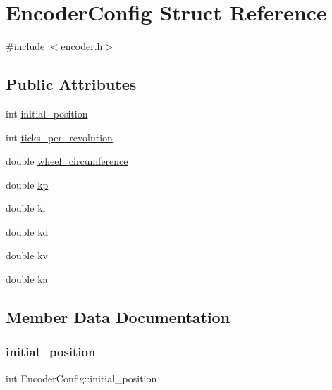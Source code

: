 \hypertarget{structEncoderConfig}{}\section{Encoder\+Config Struct Reference}
\label{structEncoderConfig}


{\ttfamily \#include $<$encoder.\+h$>$}

\subsection*{Public Attributes}
\begin{DoxyCompactItemize}
\item 
int \mbox{\hyperlink{structEncoderConfig_a14a62992c5c58d35c268189025083b16}{initial\+\_\+position}}
\item 
int \mbox{\hyperlink{structEncoderConfig_a2e0c8cadba598923ab9862073ad7be81}{ticks\+\_\+per\+\_\+revolution}}
\item 
double \mbox{\hyperlink{structEncoderConfig_af31ada23da9d2b7d4bb7fdaf6877bc00}{wheel\+\_\+circumference}}
\item 
double \mbox{\hyperlink{structEncoderConfig_a3b46cafc3487e36bcbc7a989f6ce9d7e}{kp}}
\item 
double \mbox{\hyperlink{structEncoderConfig_aa076546a13f85275b48de9348e1798ef}{ki}}
\item 
double \mbox{\hyperlink{structEncoderConfig_ab7fae8f690d761d79f3a9d6295fa7c22}{kd}}
\item 
double \mbox{\hyperlink{structEncoderConfig_a6128ef443ff9c7ea3de1ace0e43b86cb}{kv}}
\item 
double \mbox{\hyperlink{structEncoderConfig_a327c5606e1a7487c072bda6860ad9104}{ka}}
\end{DoxyCompactItemize}


\subsection{Member Data Documentation}
\mbox{\label{structEncoderConfig_a14a62992c5c58d35c268189025083b16}} 
\subsubsection{\texorpdfstring{initial\_position}{initial\_position}}
{\footnotesize\ttfamily int Encoder\+Config\+::initial\+\_\+position}

